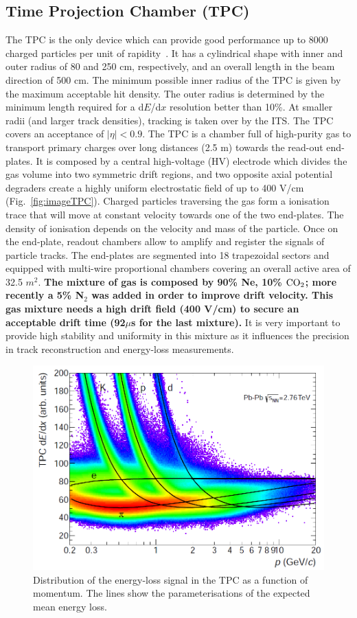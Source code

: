 \subsection{Time Projection Chamber (TPC)}
The TPC is the only device which can provide good 
performance up to 8000 charged particles per unit of rapidity~\cite{Dellacasa:451098}. 
It has a cylindrical shape with inner and outer radius of 80 and 250 cm, 
respectively, and an overall length in the beam direction of 500 cm. The minimum 
possible inner radius of the TPC is given by the maximum acceptable hit density. 
The outer radius is determined by the minimum length required for a d$E$/d$x$ resolution 
better than 10\%. At smaller radii (and larger track densities), tracking is taken over 
by the ITS. The TPC covers an acceptance of $|\eta|<0.9$. The TPC is a chamber full of 
high-purity gas to transport primary charges over long distances (2.5 m) towards the read-out end-plates. 
It is composed by a central high-voltage (HV) electrode which divides the 
gas volume into two symmetric drift regions, and two opposite axial potential degraders 
create a highly uniform electrostatic field of up to 400 V/cm (Fig.~\ref{fig:imageTPC}).
Charged particles traversing the gas form a ionisation trace that will move at constant 
velocity towards one of the two end-plates. The density of ionisation depends on the velocity and mass of the particle.
Once on the end-plate, readout chambers allow to amplify and register the signals 
of particle tracks. The end-plates are segmented into 18 trapezoidal sectors 
and equipped with multi-wire proportional chambers covering an overall active area of 32.5 $m^2$.
{\bf The mixture of gas is composed by 90\% Ne, 10\% ${\rm CO}_2$; more recently a 5\% 
N$_2$ was added in order to improve drift velocity. This gas mixture needs a high 
drift field (400 V/cm) to secure an acceptable drift time (92$\mu$s for the last mixture).} 
It is very important to provide high stability and uniformity in this mixture as it influences 
the precision in track reconstruction and energy-loss measurements. 
 \begin{figure}[!h]
\centering
\includegraphics[width=.65\textwidth]{FigCap3/TPCpid.png}
\caption{Distribution of the energy-loss signal in the TPC as a function of momentum. The lines show the parameterisations of the expected mean energy loss.}
\label{fig:imagePIDTPC}
\end{figure}
